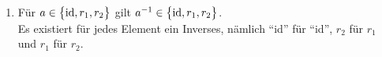 \documentclass{scrreprt}
\begin{document}
\begin{enumerate}[(1)]
\begin{enumerate}[1)]
     \begin{multicols}{3}
       \begin{itemize}
       \item $\text{id} \circ \text{id} = \text{id}$
       \item $\text{id} \circ r_1 = r_1$
       \item $\text{id} \circ r_2 = r_2$
       \item $r_1 \circ \text{id} = r_1$
       \item $r_1 \circ r_1 = r_2$
       \item $r_1 \circ r_2 = \text{id}$
       \item $r_2 \circ \text{id} = r_2$
       \item $r_2 \circ r_1 = \text{id}$
       \item $r_2 \circ r_2 = r_1$
       \end{itemize}
     \end{multicols}
  \item Für $a \in \qty\big{\text{id}, r_1, r_2}$ gilt
    $a^{-1} \in \qty\big{\text{id}, r_1, r_2}$. \\
    Es existiert für jedes Element ein Inverses, nämlich
    ``id'' für ``id'', $r_2$ für $r_1$ und $r_1$ für $r_2$.
  \end{enumerate}

\end{enumerate}
\end{document}
